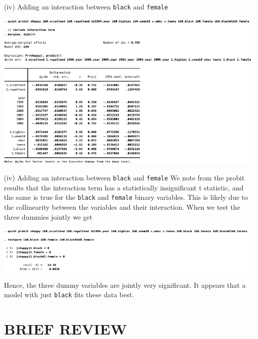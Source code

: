 \documentclass[
  10pt,
  ignorenonframetext,
]{beamer}
\begin{document}
\begin{frame}{(iv) Adding an interaction between \texttt{black} and
\texttt{female}}
\protect\hypertarget{iv-adding-an-interaction-between-black-and-female}{}
\begin{center}\includegraphics[width=1\linewidth]{pictures/ex2-PROBIT-APE-add7ctrls} \end{center}
\end{frame}

\begin{frame}[fragile]{(iv) Adding an interaction between \texttt{black}
and \texttt{female}}
\protect\hypertarget{iv-adding-an-interaction-between-black-and-female-1}{}
We note from the probit results that the interaction term has a
statistically insignificant t statistic, and the same is true for the
\texttt{black} and \texttt{female} binary variables. This is likely due
to the collinearity between the variables and their interaction. When we
test the three dummies jointly we get

\begin{center}\includegraphics[width=0.9\linewidth]{pictures/ex2-PROBIT-APE-add7ctrls-test} \end{center}

Hence, the three dummy variables are jointly very significant. It
appears that a model with just \texttt{black} fits these data best.
\end{frame}

\hypertarget{brief-review}{%
\section{BRIEF REVIEW}\label{brief-review}}
\end{document}
